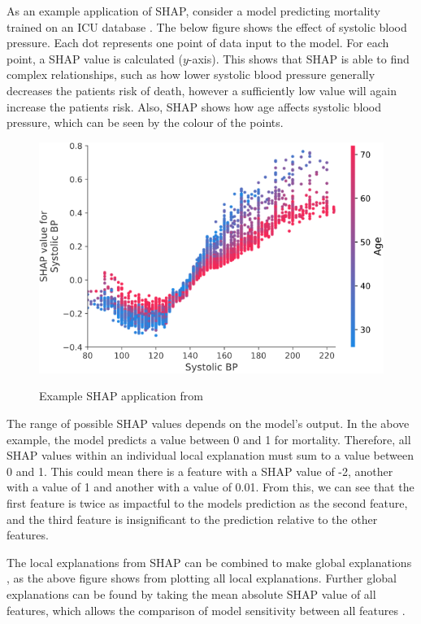 \documentclass[12pt]{article}
\begin{document}
As an example application of SHAP, consider a model predicting mortality trained on an ICU database \cite{SHAPInteraction}. The below figure shows the effect of systolic blood pressure. Each dot represents one point of data input to the model. For each point, a SHAP value is calculated ($y$-axis). This shows that SHAP is able to find complex relationships, such as how lower systolic blood pressure generally decreases the patients risk of death, however a sufficiently low value will again increase the patients risk. Also, SHAP shows how age affects systolic blood pressure, which can be seen by the colour of the points. 

\begin{figure}[H]
\centering\caption{Example SHAP application from \cite{SHAPInteraction}}
\includegraphics[scale=0.74]{SHAP example.png}
\label{SHAP Example Systolic BP}
\end{figure}
The range of possible SHAP values depends on the model's output. In the above example, the model predicts a value between 0 and 1 for mortality. Therefore, all SHAP values within an individual local explanation must sum to a value between 0 and 1. This could mean there is a feature with a SHAP value of -2, another with a value of 1 and another with a value of 0.01. From this, we can see that the first feature is twice as impactful to the models prediction as the second feature, and the third feature is insignificant to the prediction relative to the other features.

The local explanations from SHAP can be combined to make global explanations \cite{TreeExplainer}, as the above figure shows from plotting all local explanations. Further global explanations can be found by taking the mean absolute SHAP value of all features, which allows the comparison of model sensitivity between all features \cite{molnar2019}.
\end{document}
